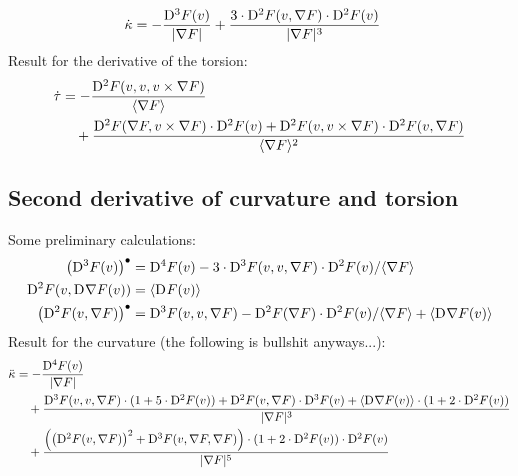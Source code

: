 \begin{align}
    \dot{ \kappa }   &=
    - \frac{ \mathrm{D}^{ 3 }F( v ) }{ \lvert  \nabla F  \rvert }  +
    \frac{ 3 \cdot \mathrm{D}^{ 2 }F( v, \nabla F ) \cdot \mathrm{D}^{ 2 }F( v ) }{
    \lvert  \nabla F  \rvert^3 }
\end{align}
Result for the derivative of the torsion:
\begin{align}
    \dot{ \tau }   &=
    - \frac{ \mathrm{D}^{ 2 }F( v, v, v \times \nabla F ) }{ \langle  \nabla F  \rangle }  \nonumber\\
    &\quad+  \frac{ \mathrm{D}^{ 2 }F( \nabla F, v \times \nabla F ) \cdot \mathrm{D}^{ 2 }F( v )  +
    \mathrm{D}^{ 2 }F( v, v \times \nabla F ) \cdot \mathrm{D}^{ 2 }F( v, \nabla F ) }{
    \langle  \nabla F  \rangle^2 }
\end{align}




\subsection{Second derivative of curvature and torsion}



Some preliminary calculations:
\begin{align}
    \left( \mathrm{D}^{ 3 }F( v ) \right)^\bullet   &=
    \mathrm{D}^{ 4 }F( v )  -
    3 \cdot \mathrm{D}^{ 3 }F( v, v, \nabla F ) \cdot \mathrm{D}^{ 2 }F( v ) / \langle \nabla F \rangle   \\
    \mathrm{D}^{ 2 }F( v, \mathrm{D}^{  }\nabla F( v ) )   &=
    \langle \mathrm{D}^{  }F( v ) \rangle   \\
    \left( \mathrm{D}^{ 2 }F( v, \nabla F ) \right)^\bullet   &=
    \mathrm{D}^{ 3 }F( v, v, \nabla F )  -
    \mathrm{D}^{ 2 }F( \nabla F ) \cdot \mathrm{D}^{ 2 }F( v ) / \langle \nabla F \rangle  +
    \langle \mathrm{D}^{  }\nabla F( v ) \rangle
\end{align}
Result for the curvature (the following is bullshit anyways...):
\begin{align}
    \ddot{\kappa}   &=
    - \frac{ \mathrm{D}^{ 4 }F( v ) }{ \lvert  \nabla F  \rvert }   \\
    &\quad+
    \frac{ \mathrm{D}^{ 3 }F( v, v, \nabla F ) \cdot ( 1 + 5 \cdot \mathrm{D}^{ 2 }F( v ) )  +
    \mathrm{D}^{ 2 }F( v, \nabla F ) \cdot \mathrm{D}^{ 3 }F( v )  +
    \langle \mathrm{D}^{  }\nabla F( v ) \rangle \cdot ( 1 + 2 \cdot \mathrm{D}^{ 2 }F( v ) ) }{ \lvert  \nabla F  \rvert^3 }   \\
    &\quad+
    \frac{ \left( \left( \mathrm{D}^{ 2 }F( v, \nabla F ) \right)^2  +  
    \mathrm{D}^{ 3 }F( v, \nabla F, \nabla F ) \right) \cdot
    ( 1 + 2 \cdot \mathrm{D}^{ 2 }F( v ) ) \cdot \mathrm{D}^{ 2 }F( v ) }{ \lvert  \nabla F  \rvert^5 }
\end{align}